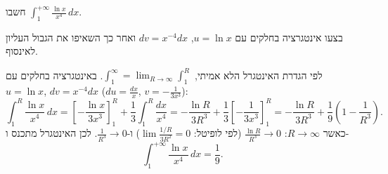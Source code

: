 
\begin{question}
חשבו $\displaystyle\int_1^{+\infty}\frac{\ln x}{x^4}\,dx$.
\end{question}

\begin{hint}
בצעו אינטגרציה בחלקים עם $u=\ln x$, $dv=x^{-4}dx$ ואחר כך השאיפו את הגבול העליון לאינסוף.
\end{hint}

\begin{solution}
לפי הגדרת האינטגרל הלא אמיתי, $\int_1^\infty=\lim_{R\to\infty}\int_1^R$. באינטגרציה בחלקים עם $u=\ln x$, $dv=x^{-4}dx$ ($du=\frac{dx}{x}$, $v=-\frac{1}{3x^3}$):
\[ \int_1^R\frac{\ln x}{x^4}\,dx=\left[-\frac{\ln x}{3x^3}\right]_1^R+\frac13\int_1^R\frac{dx}{x^4}=-\frac{\ln R}{3R^3}+\frac13\left[-\frac{1}{3x^3}\right]_1^R=-\frac{\ln R}{3R^3}+\frac19\left(1-\frac{1}{R^3}\right). \]
כאשר $R\to\infty$: $\frac{\ln R}{R^3}\to0$ (לפי לופיטל: $\lim\frac{1/R}{3R^2}=0$) ו-$\frac1{R^3}\to0$. לכן האינטגרל מתכנס ו-
\[ \int_1^{+\infty}\frac{\ln x}{x^4}\,dx=\frac19. \]
\end{solution}
